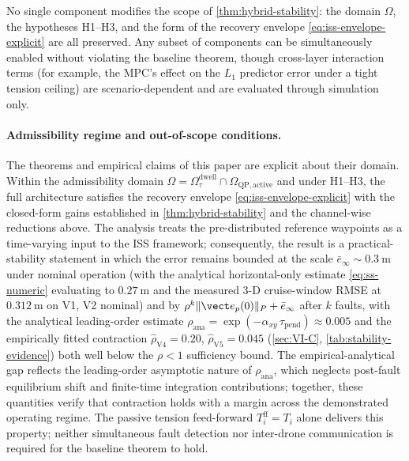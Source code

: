\begin{remark}
No single component modifies the scope of \cref{thm:hybrid-stability}: the domain $\Omega$, the hypotheses H1--H3, and the form of the recovery envelope \eqref{eq:iss-envelope-explicit} are all preserved. Any subset of components can be simultaneously enabled without violating the baseline theorem, though cross-layer interaction terms (for example, the MPC's effect on the $L_1$ predictor error under a tight tension ceiling) are scenario-dependent and are evaluated through simulation only.
\end{remark}

\paragraph{Admissibility regime and out-of-scope conditions.} The theorems and empirical claims of this paper are explicit about their domain. Within the admissibility domain $\Omega = \Omega_\tau^{\mathrm{dwell}} \cap \Omega_{\mathrm{QP, active}}$ and under H1--H3, the full architecture satisfies the recovery envelope \eqref{eq:iss-envelope-explicit} with the closed-form gains established in \cref{thm:hybrid-stability} and the channel-wise reductions above. The analysis treats the pre-distributed reference waypoints as a time-varying input to the ISS framework; consequently, the result is a practical-stability statement in which the error remains bounded at the scale $\bar{e}_\infty \sim \SI{0.3}{\metre}$ under nominal operation (with the analytical horizontal-only estimate \eqref{eq:ss-numeric} evaluating to $\SI{0.27}{\metre}$ and the measured 3-D cruise-window RMSE at $\SI{0.312}{\metre}$ on V1, V2 nominal) and by $\rho^k \|\vect e_p(0)\|_P + \bar{e}_\infty$ after $k$ faults, with the analytical leading-order estimate $\rho_{\mathrm{ana}} = \exp(-\alpha_{xy}\,\tau_{\mathrm{pend}}) \approx 0.005$ and the empirically fitted contraction $\hat\rho_{\text{V4}}\!=\!0.20$, $\hat\rho_{\text{V5}}\!=\!0.045$ (\cref{sec:VI-C}, \cref{tab:stability-evidence}) both well below the $\rho<1$ sufficiency bound. The empirical-analytical gap reflects the leading-order asymptotic nature of $\rho_{\mathrm{ana}}$, which neglects post-fault equilibrium shift and finite-time integration contributions; together, these quantities verify that contraction holds with a margin across the demonstrated operating regime. The passive tension feed-forward $T_i^{\mathrm{ff}} = T_i$ alone delivers this property; neither simultaneous fault detection nor inter-drone communication is required for the baseline theorem to hold.

